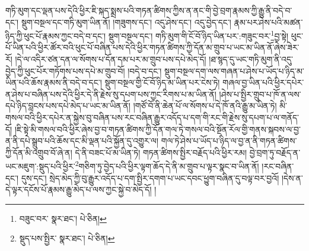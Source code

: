 གཏི་མུག་དང་ལྡན་པས་དེའི་ཕྱིར་ཇི་སྐད་སྨྲས་པའི་གཏན་ཚིགས་ཀྱིས་ན་ནང་གི་བྱེ་བྲག་རྣམས་ཀྱི་རྒྱུ་ནི་བདེ་བ་དང་། སྡུག་བསྔལ་དང་གཏི་མུག་ཡིན་ནོ། །གཟུགས་དང་། འདུ་ཤེས་དང་། འདུ་བྱེད་དང་། རྣམ་པར་ཤེས་པའི་མཚན་ཉིད་ཀྱི་ཕུང་པོ་རྣམས་ཀྱང་བདེ་བ་དང་། སྡུག་བསྔལ་དང་། གཏི་མུག་གི་ངོ་བོ་ཉིད་ཡིན་པར་:གཟུང་བར་\footnote{བཟུང་བར་  སྣར་ཐང་།  པེ་ཅིན། }བྱ་སྟེ། ཕུང་པོ་ཡིན་པའི་ཕྱིར་ཚོར་བའི་ཕུང་པོ་བཞིན་པས་དེའི་ཕྱིར་གཏན་ཚིགས་ཀྱི་དོན་མ་གྲུབ་པ་ཡང་མ་ཡིན་ནོ་ཞེས་ཟེར་རོ། །དེ་ལ་འདིར་ཙན་དན་ལ་སོགས་པ་དོན་དམ་པར་མ་གྲུབ་པས་དཔེ་མེད་དོ། །ཐ་སྙད་དུ་ཡང་གཏི་མུག་ནི་འདུ་བྱེད་ཀྱི་ཕུང་པོར་གཏོགས་པས་དཔེ་མ་གྲུབ་བོ། །བདེ་བ་དང་། སྡུག་བསྔལ་དག་ལས་གཞན་པ་ཤེས་པ་ཡོད་པ་ཉིད་མ་ཡིན་པའི་ཆོས་རྣམས་ནི་བདེ་བ་དང་། སྡུག་བསྔལ་གྱི་ངོ་བོ་ཉིད་མ་ཡིན་པར་ངེས་ཏེ། གཞལ་བྱ་ཡིན་པའི་ཕྱིར་དཔེར་ན་ཤེས་པ་བཞིན་པས་དེའི་ཕྱིར་དེ་ནི་རྗེས་སུ་དཔག་པས་ཀྱང་རིགས་པ་མ་ཡིན་ནོ། །ཤེས་པ་སྤྱིར་གྲུབ་པ་ཁོ་ན་ལས་དཔེ་ཉིད་བླངས་པས་དཔེ་མེད་པ་ཡང་མ་ཡིན་ནོ། །གཙོ་བོ་ནི་ཆེན་པོ་ལ་སོགས་པ་དེ་ཁོ་ནའི་རྒྱུ་མ་ཡིན་ཏེ། མི་གསལ་བའི་ཕྱིར་དཔེར་ན་སྐྱེས་བུ་བཞིན་པས་རང་བཞིན་རྒྱུར་འདོད་པ་དག་གི་རང་གི་རྗེས་སུ་དཔག་པ་ལ་གནོད་དོ། །ཇི་སྟེ་མི་གསལ་བའི་ཕྱིར་ཞེས་བྱ་བ་གཏན་ཚིགས་ཀྱི་དོན་གལ་ཏེ་གསལ་བའི་སྔོན་རོལ་གྱི་གནས་སྐབས་ལ་བྱ་ན་ནི་དཔེ་སྒྲུབ་པའི་ཆོས་དང་མི་ལྡན་པའི་སྐྱོན་དུ་འགྱུར་ལ། གལ་ཏེ་ཤེས་པ་ཡོད་པ་ཉིད་ལ་བྱ་ན་ནི་གཏན་ཚིགས་ཀྱི་དོན་མི་འགྲུབ་བོ་ཞེ་ན། དེ་ནི་བཟང་པོ་མ་ཡིན་ཏེ། གཏན་ཚིགས་སྤྱིར་བརྗོད་པའི་ཕྱིར་རམ། བྱེ་བྲག་ཏུ་བརྗོད་ན་ཡང་མཇུག་:སྡུད་པའི་ཕྱིར་\footnote{སྡུད་པས་སྤྱིར་  སྣར་ཐང་།  པེ་ཅིན། }གཅིག་ཏུ་བྱེད་པའི་ཕྱིར་ལྟག་ཆོད་དེ་ནི་མ་གྲུབ་པ་ལྟར་སྣང་བ་ཡིན་ནོ། །རང་བཞིན་དང་། དུས་དང་། སྲེད་མེད་ཀྱི་བུ་རྒྱུར་འདོད་པ་དག་སྤྱིར་དགག་པ་ཡང་དབང་ཕྱུག་བཞིན་དུ་བལྟ་བར་བྱའོ། །དེས་ན་དེ་ལྟར་དངོས་པོ་རྣམས་རྒྱུ་མེད་པ་ལས་ཀྱང་སྐྱེ་བ་མེད་དོ། །
